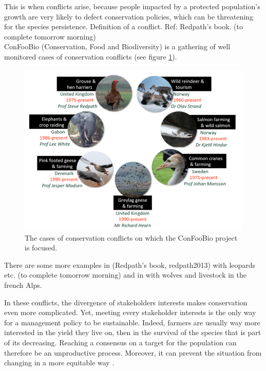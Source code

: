 \documentclass[12pt,a4paper]{article}
\begin{document}
This is when conflicts arise, because people impacted by a protected population's growth are very likely to defect conservation policies, which can be threatening for the species persistence.
Definition of a conflict. Ref: Redpath's book. (to complete tomorrow morning)\\
ConFooBio (Conservation, Food and Biodiversity) is a gathering of well monitored cases of conservation conflicts (see figure \ref{confoobio}).\\
\begin{figure}
	\centering
	\includegraphics[scale=0.5]{confoobio-cases.png}
	\caption{The cases of conservation conflicts on which the ConFooBio project is focused.}
	\label{confoobio}
\end{figure}
There are some more examples in (Redpath's book, redpath2013) with leopards etc. (to complete tomorrow morning)
and in \cite{behr2017combining} with wolves and livestock in the french Alps.

In these conflicts, the divergence of stakeholders interests makes conservation even more complicated.
Yet, meeting every stakeholder interests is the only way for a management policy to be sustainable.
Indeed, farmers are usually way more interested in the yield they live on, then in the survival of the species that is part of its decreasing.
Reaching a consensus on a target for the population can therefore be an unproductive process.
Moreover, it can prevent the situation from changing in a more equitable way \citep{peterson2005conservation}.\\
%
\end{document}
